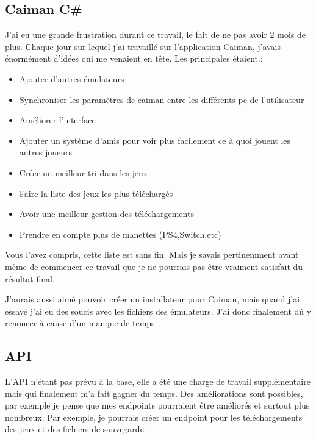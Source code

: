 \documentclass[a4paper,12pt,french]{sphinxmanual}
\begin{document}
\subsection{Caiman C\#}
\label{\detokenize{conclusion:caiman-c}}
\sphinxAtStartPar
J’ai eu une grande frustration durant ce travail, le fait de ne pas avoir 2 mois de plus. Chaque jour sur lequel j’ai travaillé sur l’application Caiman, j’avais énormément d’idées qui me venaient en tête. Les principales étaient.:
\begin{itemize}
\item {} 
\sphinxAtStartPar
Ajouter d’autres émulateurs

\item {} 
\sphinxAtStartPar
Synchroniser les paramètres de caiman entre les différents pc de l’utilisateur

\item {} 
\sphinxAtStartPar
Améliorer l’interface

\item {} 
\sphinxAtStartPar
Ajouter un système d’amis pour voir plus facilement ce à quoi jouent les autres joueurs

\item {} 
\sphinxAtStartPar
Créer un meilleur tri dans les jeux

\item {} 
\sphinxAtStartPar
Faire la liste des jeux les plus téléchargés

\item {} 
\sphinxAtStartPar
Avoir une meilleur gestion des téléchargements

\item {} 
\sphinxAtStartPar
Prendre en compte plus de manettes (PS4,Switch,etc)

\end{itemize}

\sphinxAtStartPar
Vous l’avez compris, cette liste est sans fin. Mais je savais pertinemment avant même de commencer ce travail que je ne pourrais pas être vraiment satisfait du résultat final.

\sphinxAtStartPar
J’aurais aussi aimé pouvoir créer un installateur pour Caiman, mais quand j’ai essayé j’ai eu des soucis avec les fichiers des émulateurs. J’ai donc finalement dû y renoncer à cause d’un manque de temps.


\subsection{API}
\label{\detokenize{conclusion:api}}
\sphinxAtStartPar
L’API n’étant pas prévu à la base, elle a été une charge de travail supplémentaire mais qui finalement m’a fait gagner du temps. Des améliorations sont possibles, par exemple je pense que mes endpoints pourraient être améliorés et surtout plus nombreux. Par exemple, je pourrais créer un endpoint pour les téléchargements des jeux et des fichiers de sauvegarde.
\end{document}
